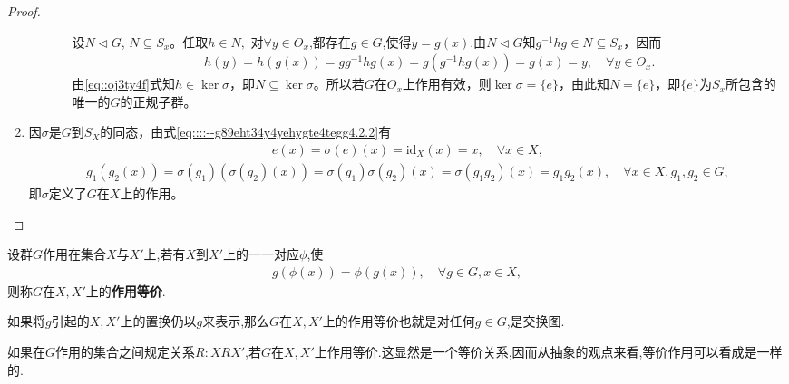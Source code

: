 \documentclass[../../main.tex]{subfiles}%
\begin{document}
\begin{proof}
\begin{enumerate}
\begin{enumerate}[(1)]
\begin{enumerate}[(i)]
设$N \lhd G$, $N \subseteq S_x$。任取$ h \in N,$ 对$\forall y\in O_x$,都存在$g \in G$,使得$y=g(x)$.由$N\lhd G$知$g^{-1}hg \in N \subseteq S_x$，因而
\begin{align*}
h(y)=h(g(x))=gg^{-1}hg\left( x \right) =g(g^{-1}hg(x))=g(x)=y,\quad \forall y\in O_x.
\end{align*}
由\eqref{eq::oj3ty4f}式知$h \in \ker\sigma$，即$N \subseteq \ker\sigma$。所以若$G$在$O_x$上作用有效，则$\ker\sigma = \{e\}$，由此知$N = \{e\}$，即$\{e\}$为$S_x$所包含的唯一的$G$的正规子群。
\end{enumerate}
\end{enumerate}

\item 因$\sigma$是$G$到$S_X$的同态，由式\eqref{eq::::--g89eht34y4yehygte4tegg4.2.2}有
\begin{align*}
e(x) = \sigma(e)(x) = \text{id}_X(x) = x, \quad \forall x \in X,
\end{align*}
\begin{align*}
g_1(g_2(x)) = \sigma(g_1)(\sigma(g_2)(x)) = \sigma(g_1)\sigma(g_2)(x) = \sigma(g_1g_2)(x) = g_1g_2(x), \quad \forall x \in X, g_1, g_2 \in G,
\end{align*}
即$\sigma$定义了$G$在$X$上的作用。
\end{enumerate}
\end{proof}

\begin{definition}
设群$G$作用在集合$X$与$X'$上,若有$X$到$X'$上的一一对应$\phi$,使
\begin{align*}
g(\phi(x)) = \phi(g(x)), \quad \forall g \in G, x \in X,
\end{align*}
则称$G$在$X, X'$上的\textbf{作用等价}.
\end{definition}
\begin{remark}
如果将$g$引起的$X, X'$上的置换仍以$g$来表示,那么$G$在$X, X'$上的作用等价也就是对任何$g \in G$,是交换图.

如果在$G$作用的集合之间规定关系$R: XRX'$,若$G$在$X, X'$上作用等价.这显然是一个等价关系,因而从抽象的观点来看,等价作用可以看成是一样的.
\begin{figure}[H]
\centering
\caption{}
\label{figure:交换图--xxx-1.1.1.1}
\end{figure}
\end{remark}
\end{document}
